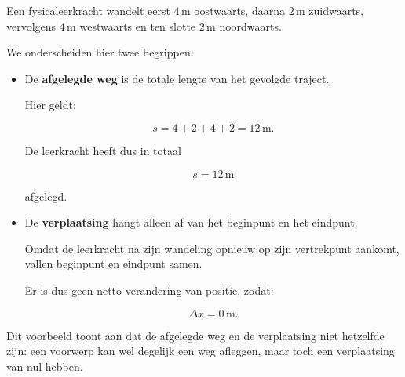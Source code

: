 \documentclass{ximera}
\begin{document}
\begin{voorbeeld}

  Een fysicaleerkracht wandelt eerst $4\,\mathrm{m}$ oostwaarts, daarna
  $2\,\mathrm{m}$ zuidwaarts, vervolgens $4\,\mathrm{m}$ westwaarts en ten slotte
  $2\,\mathrm{m}$ noordwaarts.
  
  \begin{center}
  \end{center}
  
  We onderscheiden hier twee begrippen:
  
  \begin{itemize}
      \item De \textbf{afgelegde weg} is de totale lengte van het gevolgde traject.
  
      Hier geldt:
  
      \[
      s = 4 + 2 + 4 + 2 = 12\,\mathrm{m}.
      \]
  
      De leerkracht heeft dus in totaal
  
      \[
      \boxed{s = 12\,\mathrm{m}}
      \]
  
      afgelegd.
  
      \item De \textbf{verplaatsing} hangt alleen af van het beginpunt en het
      eindpunt.
  
      Omdat de leerkracht na zijn wandeling opnieuw op zijn vertrekpunt aankomt,
      vallen beginpunt en eindpunt samen.
  
      Er is dus geen netto verandering van positie, zodat:
  
      \[
      \boxed{\Delta x = 0\,\mathrm{m}}.
      \]
  \end{itemize}
  
  Dit voorbeeld toont aan dat de afgelegde weg en de verplaatsing niet hetzelfde
  zijn: een voorwerp kan wel degelijk een weg afleggen, maar toch een
  verplaatsing van nul hebben.
  
  \end{voorbeeld}
\end{document}
